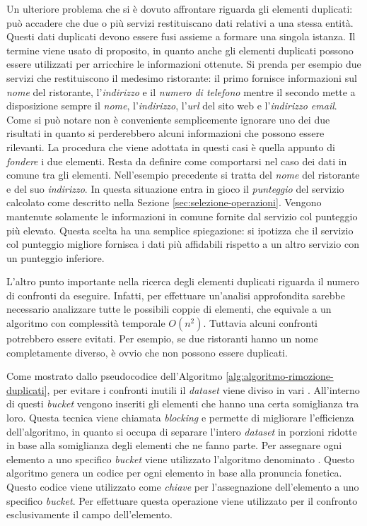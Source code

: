 Un ulteriore problema che si è dovuto affrontare riguarda gli elementi duplicati: può accadere che due o più servizi restituiscano dati relativi a una stessa entità. Questi dati duplicati devono essere fusi assieme a formare una singola istanza. Il termine  viene usato di proposito, in quanto anche gli elementi duplicati possono essere utilizzati per arricchire le informazioni ottenute. Si prenda per esempio due servizi che restituiscono il medesimo ristorante: il primo fornisce informazioni sul \emph{nome} del ristorante, l'\emph{indirizzo} e il \emph{numero di telefono} mentre il secondo mette a disposizione sempre il \emph{nome}, l'\emph{indirizzo}, l'\emph{url} del sito web e l'\emph{indirizzo email}. Come si può notare non è conveniente semplicemente ignorare uno dei due risultati in quanto si perderebbero alcuni informazioni che possono essere rilevanti. La procedura che viene adottata in questi casi è quella appunto di \emph{fondere} i due elementi. Resta da definire come comportarsi nel caso dei dati in comune tra gli elementi. Nell'esempio precedente si tratta del \emph{nome} del ristorante e del suo \emph{indirizzo}. In questa situazione entra in gioco il \emph{punteggio} del servizio calcolato come descritto nella Sezione \ref{sec:selezione-operazioni}. Vengono mantenute solamente le informazioni in comune fornite dal servizio col punteggio più elevato. Questa scelta ha una semplice spiegazione: si ipotizza che il servizio col punteggio migliore fornisca i dati più affidabili rispetto a un altro servizio con un punteggio inferiore.

L'altro punto importante nella ricerca degli elementi duplicati riguarda il numero di confronti da eseguire. Infatti, per effettuare un'analisi approfondita sarebbe necessario analizzare tutte le possibili coppie di elementi, che equivale a un algoritmo con complessità temporale $ O(n^2) $. Tuttavia alcuni confronti potrebbero essere evitati. Per esempio, se due ristoranti hanno un nome completamente diverso, è ovvio che non possono essere duplicati.

Come mostrato dallo pseudocodice dell'Algoritmo \ref{alg:algoritmo-rimozione-duplicati}, per evitare i confronti inutili il \emph{dataset} viene diviso in vari . All'interno di questi \emph{bucket} vengono inseriti gli elementi che hanno una certa somiglianza tra loro. Questa tecnica viene chiamata \emph{blocking} \cite{elmagarmid2007duplicate} e permette di migliorare l'efficienza dell'algoritmo, in quanto si occupa di separare l'intero \emph{dataset} in porzioni ridotte in base alla somiglianza degli elementi che ne fanno parte. Per assegnare ogni elemento a uno specifico \emph{bucket} viene utilizzato l'algoritmo denominato  \cite{odell1918soundex}. Questo algoritmo genera un codice per ogni elemento in base alla pronuncia fonetica. Questo codice viene utilizzato come \emph{chiave} per l'assegnazione dell'elemento a uno specifico \emph{bucket}. Per effettuare questa operazione viene utilizzato per il confronto esclusivamente il campo  dell'elemento.

